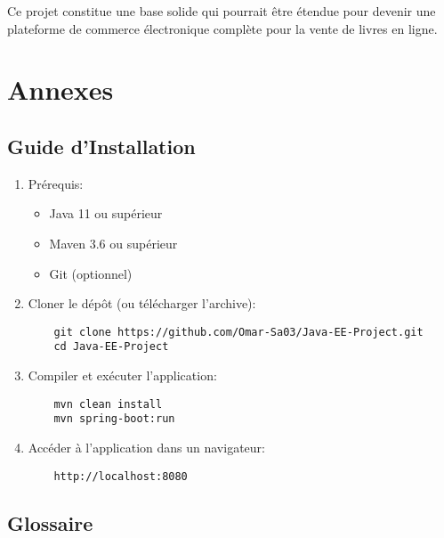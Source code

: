 \documentclass[12pt,a4paper]{report}
\begin{document}
Ce projet constitue une base solide qui pourrait être étendue pour devenir une plateforme de commerce électronique complète pour la vente de livres en ligne.

\chapter{Annexes}

\section{Guide d'Installation}

\begin{enumerate}
    \item Prérequis:
    \begin{itemize}
        \item Java 11 ou supérieur
        \item Maven 3.6 ou supérieur
        \item Git (optionnel)
    \end{itemize}
    
    \item Cloner le dépôt (ou télécharger l'archive):
    \begin{verbatim}
    git clone https://github.com/Omar-Sa03/Java-EE-Project.git
    cd Java-EE-Project
    \end{verbatim}
    
    \item Compiler et exécuter l'application:
    \begin{verbatim}
    mvn clean install
    mvn spring-boot:run
    \end{verbatim}
    
    \item Accéder à l'application dans un navigateur:
    \begin{verbatim}
    http://localhost:8080
    \end{verbatim}
\end{enumerate}

\section{Glossaire}
\end{document}
